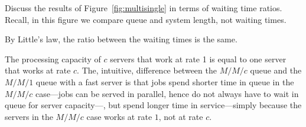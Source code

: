 \begin{question}[use=false]
  Discuss the results of Figure~\ref{fig:multisingle} in terms of
  waiting time ratios. Recall, in this figure we compare queue and
  system length, not waiting times.

  \begin{solution}
    By Little's law, the ratio between the waiting times is the same.

The processing capacity of $c$ servers that work at rate 1 is equal to
one server that works at rate $c$. The, intuitive, difference between
the $M/M/c$ queue and the $M/M/1$ queue with a fast server is that
jobs spend shorter time in queue in the $M/M/c$ case---jobs can be
served in parallel, hence do not always have to wait in queue for
server capacity---, but spend longer time in service---simply because
the servers in the $M/M/c$ case works at rate $1$, not at rate $c$.

\end{solution}
\end{question}



